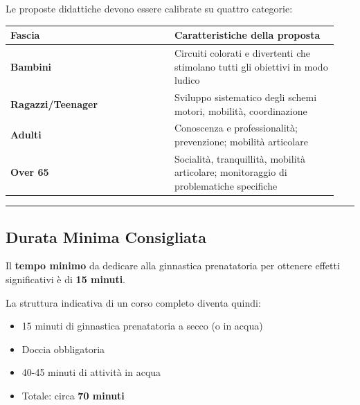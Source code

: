 \documentclass[a4paper,11pt]{article}
\providecommand{\tightlist}{%
  \setlength{\itemsep}{0pt}\setlength{\parskip}{0pt}}
\begin{document}
Le proposte didattiche devono essere calibrate su quattro categorie:

\begin{longtable}[]{@{}p{0.47\linewidth}p{0.47\linewidth}@{}}
      \toprule\noalign{}
      Fascia                    & Caratteristiche della proposta                      \\
      \midrule\noalign{}
      \endhead
      \bottomrule\noalign{}
      \endlastfoot
      \textbf{Bambini}          & Circuiti colorati e divertenti che stimolano tutti
      gli obiettivi in modo ludico                                                    \\
      \textbf{Ragazzi/Teenager} & Sviluppo sistematico degli schemi motori,
      mobilità, coordinazione                                                         \\
      \textbf{Adulti}           & Conoscenza e professionalità; prevenzione; mobilità
      articolare                                                                      \\
      \textbf{Over 65}          & Socialità, tranquillità, mobilità articolare;
      monitoraggio di problematiche specifiche                                        \\
\end{longtable}

\begin{center}\rule{0.5\linewidth}{0.5pt}\end{center}

\subsection{Durata Minima Consigliata}\label{durata-minima-consigliata}

Il \textbf{tempo minimo} da dedicare alla ginnastica prenatatoria per
ottenere effetti significativi è di \textbf{15 minuti}.

La struttura indicativa di un corso completo diventa quindi:

\begin{itemize}
      \tightlist
      \item
            15 minuti di ginnastica prenatatoria a secco (o in acqua)
      \item
            Doccia obbligatoria
      \item
            40-45 minuti di attività in acqua
      \item
            Totale: circa \textbf{70 minuti}
\end{itemize}
\end{document}
